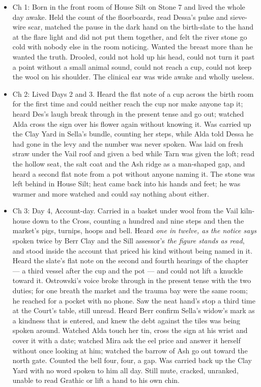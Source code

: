 \documentclass{design/chronicle}
\begin{document}
{
\begin{itemize}[leftmargin=1.4em,itemsep=1pt,topsep=3pt,parsep=0pt]

\item Ch 1: Born in the front room of House Silt on Stone 7 and lived the whole day awake. Held the count of the floorboards, read Dessa’s pulse and sieve-wire scar, matched the pause in the dark hand on the birth-slate to the hand at the flare light and did not put them together, and felt the river stone go cold with nobody else in the room noticing. Wanted the breast more than he wanted the truth. Drooled, could not hold up his head, could not turn it past a point without a small animal sound, could not reach a cup, could not keep the wool on his shoulder. The clinical ear was wide awake and wholly useless.

\item Ch 2: Lived Days 2 and 3. Heard the flat note of a cup across the birth room for the first time and could neither reach the cup nor make anyone tap it; heard Des’s laugh break through in the present tense and go out; watched Alda cross the sign over his flower again without knowing it. Was carried up the Clay Yard in Sella’s bundle, counting her steps, while Alda told Dessa he had gone in the levy and the number was never spoken. Was laid on fresh straw under the Vail roof and given a bed while Tarn was given the loft; read the hollow seat, the salt coat and the Ash ridge as a man-shaped gap, and heard a second flat note from a pot without anyone naming it. The stone was left behind in House Silt; heat came back into his hands and feet; he was warmer and more watched and could say nothing about either.

\item Ch 3: Day 4, Account-day. Carried in a basket under wool from the Vail kiln-house down to the Cross, counting a hundred and nine steps and then the market’s pigs, turnips, hoops and bell. Heard \emph{one in twelve, as the notice says} spoken twice by Berr Clay and the Sill assessor’s \emph{the figure stands as read}, and stood inside the account that priced his kind without being named in it. Heard the slate’s flat note on the second and fourth hearings of the chapter --- a third vessel after the cup and the pot --- and could not lift a knuckle toward it. Ostrowski’s voice broke through in the present tense with the two duties; for one breath the market and the trauma bay were the same room; he reached for a pocket with no phone. Saw the neat hand’s stop a third time at the Court’s table, still unread. Heard Berr confirm Sella’s widow’s mark as a kindness that is entered, and knew the debt against the tiles was being spoken around. Watched Alda touch her tin, cross the sign at his wrist and cover it with a date; watched Mira ask the eel price and answer it herself without once looking at him; watched the barrow of Ash go out toward the north gate. Counted the bell four, four, a gap. Was carried back up the Clay Yard with no word spoken to him all day. Still mute, cracked, unranked, unable to read Grathic or lift a hand to his own chin.


\end{itemize}}
\end{document}
